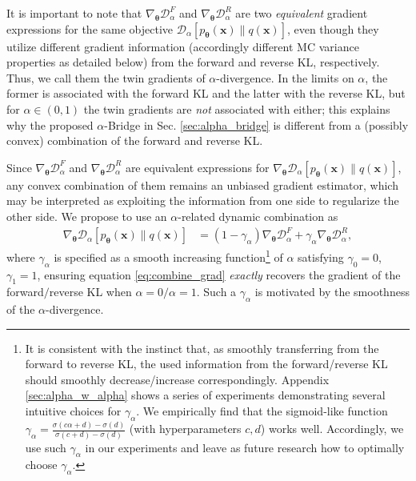 \documentclass[letterpaper]{article} %
\newcommand{\Dc}[0]{\ensuremath{\mathcal{D}} }
\newcommand{\xv}[0]{\ensuremath{\boldsymbol{x}} }
\newcommand{\thetav}[0]{\ensuremath{\boldsymbol{\theta}} }
\begin{document}
It is important to note that $\nabla_{\thetav} \Dc_{\alpha}^F$ and $\nabla_{\thetav} \Dc_{\alpha}^R$ are two {\em equivalent} gradient expressions for the same objective $\Dc_{\alpha} [p_{\thetav}(\xv) \| q(\xv)]$, even though they utilize different gradient information (accordingly different MC variance properties as detailed below) from the forward and reverse KL, respectively. Thus, we call them the twin gradients of $\alpha$-divergence. In the limits on $\alpha$, the former is associated with the forward KL and the latter with the reverse KL, but for $\alpha\in (0,1)$ the twin gradients are {\em not} associated with either; this explains why the proposed $\alpha$-Bridge in Sec. \ref{sec:alpha_bridge} is different from a (possibly convex) combination of the forward and reverse KL.

Since $\nabla_{\thetav} \Dc_{\alpha}^F$ and $\nabla_{\thetav} \Dc_{\alpha}^R$ are equivalent expressions for $\nabla_{\thetav} \Dc_{\alpha} [p_{\thetav}(\xv) \| q(\xv)]$, any convex combination of them remains an unbiased gradient estimator, which may be interpreted as exploiting the information from one side to regularize the other side.
We propose to use an $\alpha$-related dynamic combination as
\begin{equation}\label{eq:combine_grad}
\begin{aligned}
\nabla_{\thetav} \Dc_{\alpha} [p_{\thetav}(\xv) \| q(\xv)]
& = (1 - \gamma_{\alpha}) \nabla_{\thetav} \Dc_{\alpha}^F
+ \gamma_{\alpha} \nabla_{\thetav} \Dc_{\alpha}^R,
\end{aligned}
\end{equation}
where $\gamma_{\alpha}$ is specified as a smooth increasing function\footnote{It is consistent with the instinct that, as smoothly transferring from the forward to reverse KL, the used information from the forward/reverse KL should smoothly decrease/increase correspondingly.
	Appendix \ref{sec:alpha_w_alpha}
	shows a series of experiments demonstrating several intuitive choices for $\gamma_{\alpha}$. We empirically find that the sigmoid-like function $\gamma_{\alpha} = \frac{\sigma(c\alpha+d) - \sigma(d)}{\sigma(c+d)-\sigma(d)}$ (with hyperparameters $c,d$) works well.
	Accordingly, we use such $\gamma_{\alpha}$ in our experiments and leave as future research how to optimally choose $\gamma_{\alpha}$.
} of $\alpha$ satisfying $\gamma_{0} = 0$, $\gamma_{1}=1$, ensuring equation \eqref{eq:combine_grad} \emph{exactly} recovers the gradient of the forward$/$reverse KL when $\alpha=0 / \alpha=1$.
Such a $\gamma_{\alpha}$ is motivated by the smoothness of the $\alpha$-divergence.
\end{document}
